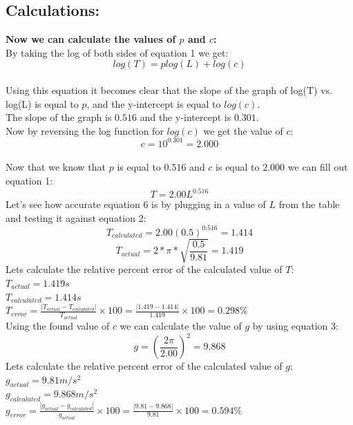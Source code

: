 \documentclass[12pt]{extarticle}
\begin{document}
\subsection{Calculations:}
\textbf{Now we can calculate the values of $p$ and $c$:}
\\By taking the log of both sides of equation 1 we get:
\begin{equation}
    log(T) = plog(L) + log(c)
\end{equation}
\\Using this equation it becomes clear that the slope of the graph of log(T) vs. log(L) is equal to $p$, and the y-intercept is equal to $log(c)$.
\\The slope of the graph is $0.516$ and the y-intercept is $0.301$.
\\Now by reversing the log function for $log(c)$ we get the value of $c$:
\begin{equation}
    c = 10^{0.301} = 2.000
\end{equation}
\\Now that we know that $p$ is equal to $0.516$ and $c$ is equal to $2.000$ we can fill out equation 1:
\begin{equation}
    T = 2.00L^{0.516}
\end{equation}
Let's see how accurate equation 6 is by plugging in a value of $L$ from the table and testing it against equation 2:
\begin{equation}
    T_{calculated} = 2.00(0.5)^{0.516} = 1.414
\end{equation}
\begin{equation}
    T_{actual} = 2*\pi*\sqrt{\frac{0.5}{9.81}} = 1.419
\end{equation}
Lets calculate the relative percent error of the calculated value of $T$:
\\$T_{actual} = 1.419 s$
    \\$T_{calculated} = 1.414 s$
\\$T_{error} = \frac{|T_{actual} - T_{calculated}|}{T_{actual}} \times 100 = \frac{|1.419 - 1.414|}{1.419} \times 100  = 0.298 \%$
    \\Using the found value of $c$ we can calculate the value of $g$ by using equation 3:
    \begin{equation}
        g = (\frac{2 \pi}{2.00})^2 = 9.868
    \end{equation}
    Lets calculate the relative percent error of the calculated value of $g$:
    \\$g_{actual} = 9.81 m/s^2$
\\$g_{calculated} = 9.868 m/s^2$
    \\$g_{error} = \frac{|g_{actual} - g_{calculated}|}{g_{actual}} \times 100 = \frac{|9.81 - 9.868|}{9.81} \times 100  = 0.594 \%$
\pagebreak
\end{document}
